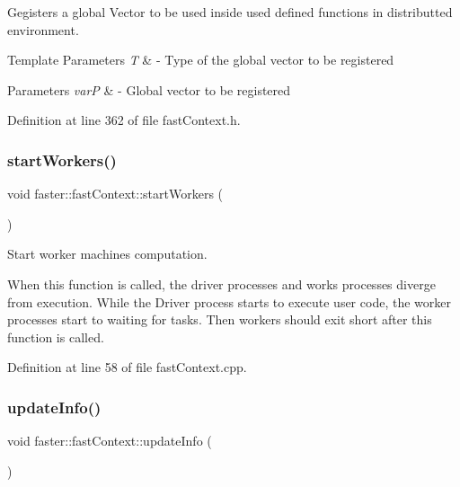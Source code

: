 Gegisters a global Vector to be used inside used defined functions in distributted environment. 


\begin{DoxyTemplParams}{Template Parameters}
{\em T} & -\/ Type of the global vector to be registered \\
\hline
\end{DoxyTemplParams}

\begin{DoxyParams}{Parameters}
{\em varP} & -\/ Global vector to be registered \\
\hline
\end{DoxyParams}


Definition at line 362 of file fast\+Context.\+h.

\hypertarget{classfaster_1_1fastContext_a1f6b1c1a940d67b434ac95bad4770508}{}\label{classfaster_1_1fastContext_a1f6b1c1a940d67b434ac95bad4770508} 
\subsubsection{\texorpdfstring{start\+Workers()}{startWorkers()}}
{\footnotesize\ttfamily void faster\+::fast\+Context\+::start\+Workers (\begin{DoxyParamCaption}{ }\end{DoxyParamCaption})}



Start worker machines computation. 

When this function is called, the driver processes and works processes diverge from execution. While the Driver process starts to execute user code, the worker processes start to waiting for tasks. Then workers should exit short after this function is called. 

Definition at line 58 of file fast\+Context.\+cpp.

\hypertarget{classfaster_1_1fastContext_ae6e69c86414bc5333da72aef13257d26}{}\label{classfaster_1_1fastContext_ae6e69c86414bc5333da72aef13257d26} 
\subsubsection{\texorpdfstring{update\+Info()}{updateInfo()}}
{\footnotesize\ttfamily void faster\+::fast\+Context\+::update\+Info (\begin{DoxyParamCaption}{ }\end{DoxyParamCaption})}



